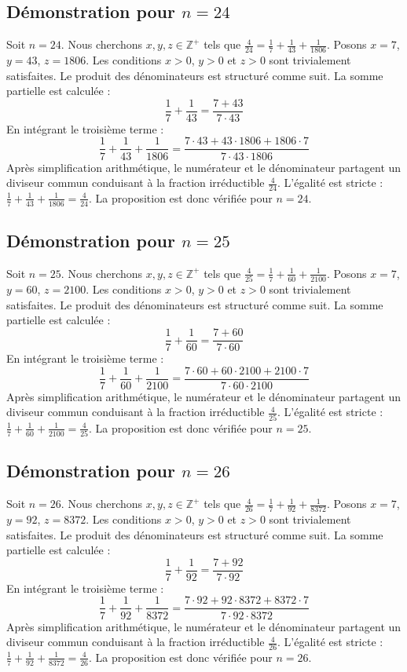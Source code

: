 \documentclass[11pt,a4paper]{article}
\begin{document}
\subsection{Démonstration pour $n = 24$}
Soit $n = 24$. Nous cherchons $x, y, z \in \mathbb{Z}^{+}$ tels que $\frac{4}{24} = \frac{1}{7} + \frac{1}{43} + \frac{1}{1806}$.
Posons $x = 7$, $y = 43$, $z = 1806$.
Les conditions $x > 0$, $y > 0$ et $z > 0$ sont trivialement satisfaites.
Le produit des dénominateurs est structuré comme suit. La somme partielle est calculée :
$$ \frac{1}{7} + \frac{1}{43} = \frac{7+43}{7 \cdot 43} $$
En intégrant le troisième terme :
$$ \frac{1}{7} + \frac{1}{43} + \frac{1}{1806} = \frac{7 \cdot 43 + 43 \cdot 1806 + 1806 \cdot 7}{7 \cdot 43 \cdot 1806} $$
Après simplification arithmétique, le numérateur et le dénominateur partagent un diviseur commun conduisant à la fraction irréductible $\frac{4}{24}$.
L'égalité est stricte : $\frac{1}{7} + \frac{1}{43} + \frac{1}{1806} = \frac{4}{24}$.
La proposition est donc vérifiée pour $n = 24$.
\subsection{Démonstration pour $n = 25$}
Soit $n = 25$. Nous cherchons $x, y, z \in \mathbb{Z}^{+}$ tels que $\frac{4}{25} = \frac{1}{7} + \frac{1}{60} + \frac{1}{2100}$.
Posons $x = 7$, $y = 60$, $z = 2100$.
Les conditions $x > 0$, $y > 0$ et $z > 0$ sont trivialement satisfaites.
Le produit des dénominateurs est structuré comme suit. La somme partielle est calculée :
$$ \frac{1}{7} + \frac{1}{60} = \frac{7+60}{7 \cdot 60} $$
En intégrant le troisième terme :
$$ \frac{1}{7} + \frac{1}{60} + \frac{1}{2100} = \frac{7 \cdot 60 + 60 \cdot 2100 + 2100 \cdot 7}{7 \cdot 60 \cdot 2100} $$
Après simplification arithmétique, le numérateur et le dénominateur partagent un diviseur commun conduisant à la fraction irréductible $\frac{4}{25}$.
L'égalité est stricte : $\frac{1}{7} + \frac{1}{60} + \frac{1}{2100} = \frac{4}{25}$.
La proposition est donc vérifiée pour $n = 25$.
\subsection{Démonstration pour $n = 26$}
Soit $n = 26$. Nous cherchons $x, y, z \in \mathbb{Z}^{+}$ tels que $\frac{4}{26} = \frac{1}{7} + \frac{1}{92} + \frac{1}{8372}$.
Posons $x = 7$, $y = 92$, $z = 8372$.
Les conditions $x > 0$, $y > 0$ et $z > 0$ sont trivialement satisfaites.
Le produit des dénominateurs est structuré comme suit. La somme partielle est calculée :
$$ \frac{1}{7} + \frac{1}{92} = \frac{7+92}{7 \cdot 92} $$
En intégrant le troisième terme :
$$ \frac{1}{7} + \frac{1}{92} + \frac{1}{8372} = \frac{7 \cdot 92 + 92 \cdot 8372 + 8372 \cdot 7}{7 \cdot 92 \cdot 8372} $$
Après simplification arithmétique, le numérateur et le dénominateur partagent un diviseur commun conduisant à la fraction irréductible $\frac{4}{26}$.
L'égalité est stricte : $\frac{1}{7} + \frac{1}{92} + \frac{1}{8372} = \frac{4}{26}$.
La proposition est donc vérifiée pour $n = 26$.
\end{document}
